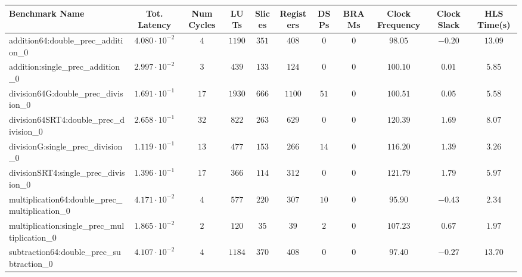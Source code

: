 \begin{tabular}{|l|c|c|c|c|c|c|c|c|c|c|}
\hline
Benchmark Name                                   & Tot. Latency            & Num Cycles & LUTs     & Slices   & Registers & DSPs   & BRAMs & Clock Frequency & Clock Slack & HLS Time(s) \\
\hline
addition64:double\_prec\_addition\_0             & $ 4.080 \cdot 10^{-2} $ & $ 4      $ & $ 1190 $ & $ 351  $ & $ 408   $ & $ 0  $ & $ 0 $ & $ 98.05       $ & $ -0.20   $ & $ 13.09   $ \\
addition:single\_prec\_addition\_0               & $ 2.997 \cdot 10^{-2} $ & $ 3      $ & $ 439  $ & $ 133  $ & $ 124   $ & $ 0  $ & $ 0 $ & $ 100.10      $ & $ 0.01    $ & $ 5.85    $ \\
division64G:double\_prec\_division\_0            & $ 1.691 \cdot 10^{-1} $ & $ 17     $ & $ 1930 $ & $ 666  $ & $ 1100  $ & $ 51 $ & $ 0 $ & $ 100.51      $ & $ 0.05    $ & $ 5.58    $ \\
division64SRT4:double\_prec\_division\_0         & $ 2.658 \cdot 10^{-1} $ & $ 32     $ & $ 822  $ & $ 263  $ & $ 629   $ & $ 0  $ & $ 0 $ & $ 120.39      $ & $ 1.69    $ & $ 8.07    $ \\
divisionG:single\_prec\_division\_0              & $ 1.119 \cdot 10^{-1} $ & $ 13     $ & $ 477  $ & $ 153  $ & $ 266   $ & $ 14 $ & $ 0 $ & $ 116.20      $ & $ 1.39    $ & $ 3.26    $ \\
divisionSRT4:single\_prec\_division\_0           & $ 1.396 \cdot 10^{-1} $ & $ 17     $ & $ 366  $ & $ 114  $ & $ 312   $ & $ 0  $ & $ 0 $ & $ 121.79      $ & $ 1.79    $ & $ 5.97    $ \\
multiplication64:double\_prec\_multiplication\_0 & $ 4.171 \cdot 10^{-2} $ & $ 4      $ & $ 577  $ & $ 220  $ & $ 307   $ & $ 10 $ & $ 0 $ & $ 95.90       $ & $ -0.43   $ & $ 2.34    $ \\
multiplication:single\_prec\_multiplication\_0   & $ 1.865 \cdot 10^{-2} $ & $ 2      $ & $ 120  $ & $ 35   $ & $ 39    $ & $ 2  $ & $ 0 $ & $ 107.23      $ & $ 0.67    $ & $ 1.97    $ \\
subtraction64:double\_prec\_subtraction\_0       & $ 4.107 \cdot 10^{-2} $ & $ 4      $ & $ 1184 $ & $ 370  $ & $ 408   $ & $ 0  $ & $ 0 $ & $ 97.40       $ & $ -0.27   $ & $ 13.70   $ \\

\end{tabular}
